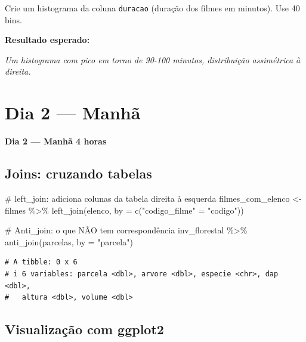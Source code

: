 \documentclass[
  letterpaper,
]{scrbook}
\newenvironment{Shaded}{\begin{snugshade}}{\end{snugshade}}
\newcommand{\AttributeTok}[1]{\textcolor[rgb]{0.40,0.45,0.13}{#1}}
\newcommand{\CommentTok}[1]{\textcolor[rgb]{0.37,0.37,0.37}{#1}}
\newcommand{\FunctionTok}[1]{\textcolor[rgb]{0.28,0.35,0.67}{#1}}
\newcommand{\NormalTok}[1]{\textcolor[rgb]{0.00,0.23,0.31}{#1}}
\newcommand{\OtherTok}[1]{\textcolor[rgb]{0.00,0.23,0.31}{#1}}
\newcommand{\SpecialCharTok}[1]{\textcolor[rgb]{0.37,0.37,0.37}{#1}}
\newcommand{\StringTok}[1]{\textcolor[rgb]{0.13,0.47,0.30}{#1}}
\begin{document}
Crie um histograma da coluna \texttt{duracao} (duração dos filmes em
minutos). Use 40 bins.

\textbf{Resultado esperado:}

\emph{Um histograma com pico em torno de 90-100 minutos, distribuição
assimétrica à direita.}

\chapter{Dia 2 --- Manhã}\label{dia-2-manhuxe3}

\textbf{Dia 2 --- Manhã \textbar{} 4 horas}

\section*{Joins: cruzando tabelas}\label{joins-cruzando-tabelas}


\begin{Shaded}
\begin{Highlighting}[]
\CommentTok{\# left\_join: adiciona colunas da tabela direita à esquerda}
\NormalTok{filmes\_com\_elenco }\OtherTok{\textless{}{-}}\NormalTok{ filmes }\SpecialCharTok{\%\textgreater{}\%} \FunctionTok{left\_join}\NormalTok{(elenco, }\AttributeTok{by =} \FunctionTok{c}\NormalTok{(}\StringTok{"codigo\_filme"} \OtherTok{=} \StringTok{"codigo"}\NormalTok{))}

\CommentTok{\# Anti\_join: o que NÃO tem correspondência}
\NormalTok{inv\_florestal }\SpecialCharTok{\%\textgreater{}\%} \FunctionTok{anti\_join}\NormalTok{(parcelas, }\AttributeTok{by =} \StringTok{"parcela"}\NormalTok{)}
\end{Highlighting}
\end{Shaded}

\begin{verbatim}
# A tibble: 0 x 6
# i 6 variables: parcela <dbl>, arvore <dbl>, especie <chr>, dap <dbl>,
#   altura <dbl>, volume <dbl>
\end{verbatim}

\section*{Visualização com
ggplot2}\label{visualizauxe7uxe3o-com-ggplot2}

\end{document}
